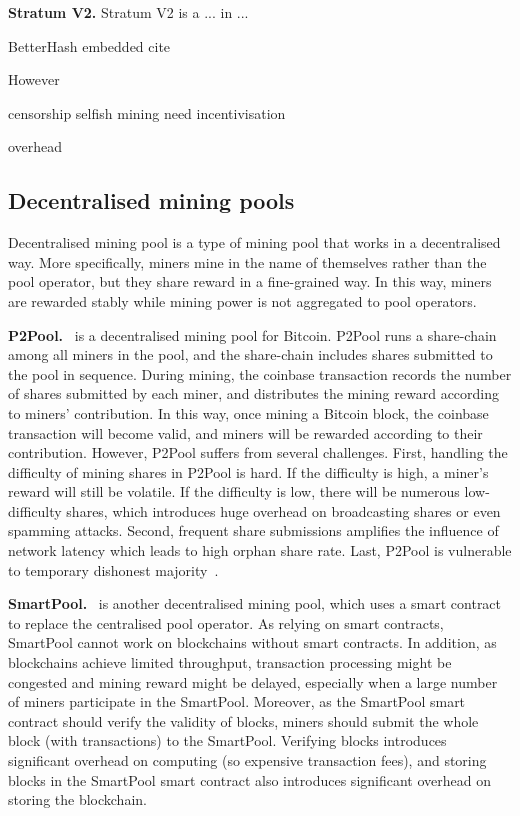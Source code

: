 \textbf{Stratum V2.}
Stratum V2 is a ...
in ...

BetterHash embedded
cite

However

censorship
selfish mining
need incentivisation

overhead



\subsection{Decentralised mining pools}



Decentralised mining pool is a type of mining pool that works in a decentralised way.
More specifically, miners mine in the name of themselves rather than the pool operator, but they share reward in a fine-grained way.
In this way, miners are rewarded stably while mining power is not aggregated to pool operators.



\textbf{P2Pool.}~\cite{voight2011p2pool} is a decentralised mining pool for Bitcoin.
P2Pool runs a share-chain among all miners in the pool, and the share-chain includes shares submitted to the pool in sequence.
During mining, the coinbase transaction records the number of shares submitted by each miner, and distributes the mining reward according to miners' contribution.
In this way, once mining a Bitcoin block, the coinbase transaction will become valid, and miners will be rewarded according to their contribution.
However, P2Pool suffers from several challenges.
First, handling the difficulty of mining shares in P2Pool is hard.
If the difficulty is high, a miner's reward will still be volatile.
If the difficulty is low, there will be numerous low-difficulty shares, which introduces huge overhead on broadcasting shares or even spamming attacks.
Second, frequent share submissions amplifies the influence of network latency which leads to high orphan share rate.
Last, P2Pool is vulnerable to temporary dishonest majority~\cite{decentralised-mining-pool-security}.

\textbf{SmartPool.}~\cite{luu2017smartpool} is another decentralised mining pool, which uses a smart contract to replace the centralised pool operator.
As relying on smart contracts, SmartPool cannot work on blockchains without smart contracts.
In addition, as blockchains achieve limited throughput, transaction processing might be congested and mining reward might be delayed, especially when a large number of miners participate in the SmartPool.
Moreover, as the SmartPool smart contract should verify the validity of blocks, miners should submit the whole block (with transactions) to the SmartPool.
Verifying blocks introduces significant overhead on computing (so expensive transaction fees), and storing blocks in the SmartPool smart contract also introduces significant overhead on storing the blockchain.

